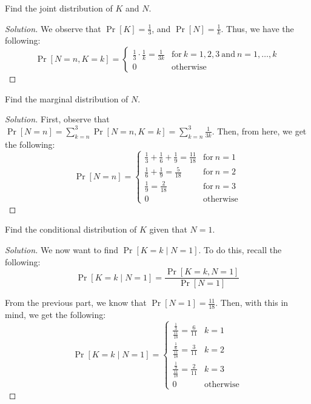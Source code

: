 \documentclass{article}
\newenvironment{solution}{\begin{proof}[Solution]}{\end{proof}}
\let\oldsum\sum
\renewcommand{\sum}[2]{\oldsum\limits_{#1}^{#2}}
\begin{document}
\begin{hw}
	Find the joint distribution of $K$ and $N$.
\end{hw}
\begin{solution}
	We observe that $\Pr[K] = \frac{1}{3}$, and $\Pr[N] = \frac{1}{k}$. Thus, we have the following:
	\[
	\Pr[N=n, K=k] =
	\begin{cases}
		\frac{1}{3} \cdot \frac{1}{k} = \frac{1}{3k} & \text{for}\ k = 1,2,3 \ \text{and}\ n = 1, \ldots, k \\
		0 & \text{otherwise}
	\end{cases}
	\]
\end{solution}

\begin{hw}
	Find the marginal distribution of $N$.
\end{hw}
\begin{solution}
	First, observe that $\Pr[N=n] = \sum{k=n}{3} \Pr[N=n, K=k] = \sum{k=n}{3} \frac{1}{3k}$. Then, from here, we get the following:
	\[
	\Pr[N=n] =
	\begin{cases}
		\frac{1}{3} + \frac{1}{6} + \frac{1}{9} = \frac{11}{18} & \text{for}\ n=1 \\
		\frac{1}{6} + \frac{1}{9} = \frac{5}{18} & \text{for}  \ n=2 \\
		\frac{1}{9} = \frac{2}{18} & \text{for}\ n=3 \\
		0 & \text{otherwise}
	\end{cases}
	\]
\end{solution}

\begin{hw}
	Find the conditional distribution of $K$ given that $N=1$.
\end{hw}
\begin{solution}
	We now want to find $\Pr[K = k \mid N = 1]$. To do this, recall the following:
	\begin{equation*}
		\Pr[K = k \mid N = 1] = \dfrac{\Pr[K=k, N = 1]}{\Pr[N=1]}
	\end{equation*}

	From the previous part, we know that $\Pr[N=1] = \frac{11}{18}$. Then, with this in mind, we get the following:
	\[
	\Pr[K = k \mid N = 1] =
	\begin{cases}
		\frac{\frac{1}{3}}{\frac{11}{18}} = \frac{6}{11} & k = 1 \\
		\frac{\frac{1}{6}}{\frac{11}{18}} = \frac{3}{11} & k = 2 \\
		\frac{\frac{1}{9}}{\frac{11}{18}} = \frac{2}{11} & k = 3 \\
		0 & \text{otherwise}
	\end{cases}
	\]
\end{solution}
\end{document}
